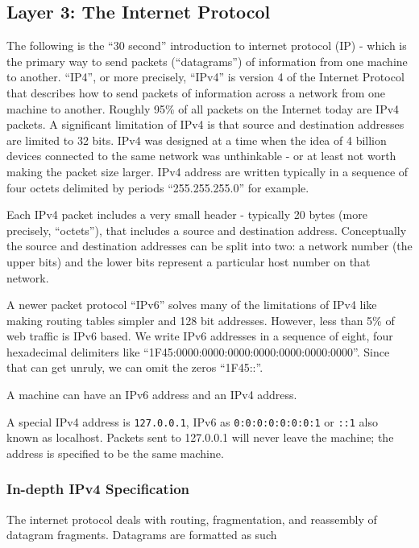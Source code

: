 \documentclass[]{article}
\begin{document}
\subsection{Layer 3: The Internet
Protocol}\label{layer-3-the-internet-protocol}

The following is the ``30 second'' introduction to internet protocol
(IP) - which is the primary way to send packets (``datagrams'') of
information from one machine to another. ``IP4'', or more precisely,
``IPv4'' is version 4 of the Internet Protocol that describes how to
send packets of information across a network from one machine to
another. Roughly 95\% of all packets on the Internet today are IPv4
packets. A significant limitation of IPv4 is that source and destination
addresses are limited to 32 bits. IPv4 was designed at a time when the
idea of 4 billion devices connected to the same network was unthinkable
- or at least not worth making the packet size larger. IPv4 address are
written typically in a sequence of four octets delimited by periods
``255.255.255.0'' for example.

Each IPv4 packet includes a very small header - typically 20 bytes (more
precisely, ``octets''), that includes a source and destination address.
Conceptually the source and destination addresses can be split into two:
a network number (the upper bits) and the lower bits represent a
particular host number on that network.

A newer packet protocol ``IPv6'' solves many of the limitations of IPv4
like making routing tables simpler and 128 bit addresses. However, less
than 5\% of web traffic is IPv6 based. We write IPv6 addresses in a
sequence of eight, four hexadecimal delimiters like
``1F45:0000:0000:0000:0000:0000:0000:0000''. Since that can get unruly,
we can omit the zeros ``1F45::''.

A machine can have an IPv6 address and an IPv4 address.

A special IPv4 address is \texttt{127.0.0.1}, IPv6 as
\texttt{0:0:0:0:0:0:0:1} or \texttt{::1} also known as localhost.
Packets sent to 127.0.0.1 will never leave the machine; the address is
specified to be the same machine.

\subsubsection{In-depth IPv4
Specification}\label{in-depth-ipv4-specification}

The internet protocol deals with routing, fragmentation, and reassembly
of datagram fragments. Datagrams are formatted as such
\end{document}
